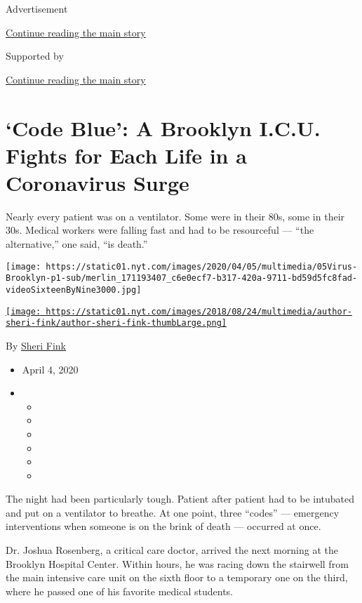 Advertisement

\protect\hyperlink{after-top}{Continue reading the main story}

Supported by

\protect\hyperlink{after-sponsor}{Continue reading the main story}

\hypertarget{code-blue-a-brooklyn-icu-fights-for-each-life-in-a-coronavirus-surge}{%
\section{`Code Blue': A Brooklyn I.C.U. Fights for Each Life in a
Coronavirus
Surge}\label{code-blue-a-brooklyn-icu-fights-for-each-life-in-a-coronavirus-surge}}

Nearly every patient was on a ventilator. Some were in their 80s, some
in their 30s. Medical workers were falling fast and had to be
resourceful --- ``the alternative,'' one said, ``is death.''

\texttt{[image: https://static01.nyt.com/images/2020/04/05/multimedia/05Virus-Brooklyn-p1-sub/merlin\_171193407\_c6e0ecf7-b317-420a-9711-bd59d5fc8fad-videoSixteenByNine3000.jpg]}

\href{https://www.nytimes.com/by/sheri-fink}{\texttt{[image: https://static01.nyt.com/images/2018/08/24/multimedia/author-sheri-fink/author-sheri-fink-thumbLarge.png]}}

By \href{https://www.nytimes.com/by/sheri-fink}{Sheri Fink}

\begin{itemize}
\item
  April 4, 2020
\item
  \begin{itemize}
  \item
  \item
  \item
  \item
  \item
  \item
  \end{itemize}
\end{itemize}

The night had been particularly tough. Patient after patient had to be
intubated and put on a ventilator to breathe. At one point, three
``codes'' --- emergency interventions when someone is on the brink of
death --- occurred at once.

Dr. Joshua Rosenberg, a critical care doctor, arrived the next morning
at the Brooklyn Hospital Center. Within hours, he was racing down the
stairwell from the main intensive care unit on the sixth floor to a
temporary one on the third, where he passed one of his favorite medical
students.

